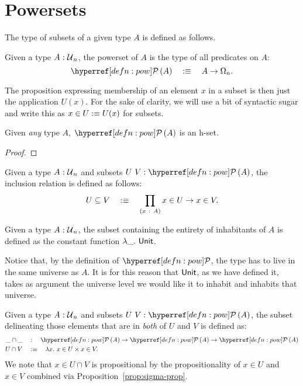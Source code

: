 \section{Powersets}\label{sec:pow}

The type of subsets of a given type $A$ is defined as follows.

\begin{defn}\label{defn:pow}
  Given a type $A\hspace{0.1mm}:\hspace{0.1mm}\mathcal{U}{}_n$, the powerset of $A$ is the type of all predicates
  on $A$:
  \begin{equation*}
    \pow{A} \quad\is\quad A \rightarrow \Omega_n.
  \end{equation*}
\end{defn}

The proposition expressing membership of an element $x$ in a subset is then just the
application $U(x)$. For the sake of clarity, we will use a bit of syntactic sugar and
write this as $x \in U :\equiv U(x)$ for subsets.

\begin{prop}\label{prop:pow-set}
  Given \emph{any} type $A$, $\pow{A}$ is an h-set.
\end{prop}
\begin{proof}
\end{proof}

\begin{defn}\label{defn:inclusion}
  Given a type $A\hspace{0.1mm}:\hspace{0.1mm}\mathcal{U}{}_n$ and subsets $\oftyII{U}{V}{\pow{A}}$, the inclusion
  relation is defined as follows:
  \begin{equation*}
    U \subseteq V \quad:\equiv\quad \prod_{(x~:~A)} x \in U \rightarrow x \in V.
  \end{equation*}
\end{defn}

\begin{defn}\label{defn:entire-subset}
  Given a type $A\hspace{0.1mm}:\hspace{0.1mm}\mathcal{U}{}_n$, the subset containing the entirety of inhabitants
  of $A$ is defined as the constant function $\lambda\_.~\mathsf{Unit}{}$.

  Notice that, by the definition of $\pownm{}$, the type has to live in the same universe
  as $A$. It is for this reason that $\mathsf{Unit}{}$, as we have defined it, takes as argument
  the universe level we would like it to inhabit and inhabits that universe.
\end{defn}

\begin{defn}\label{defn:intersection}
  Given a type $A\hspace{0.1mm}:\hspace{0.1mm}\mathcal{U}{}_n$ and subsets $\oftyII{U}{V}{\pow{A}}$, the subset
  delineating those elements that are in \emph{both} of $U$ and $V$ is defined as:
  \begin{align*}
    \_\cap\_  \quad&:\quad   \pow{A} \rightarrow \pow{A} \rightarrow \pow{A} \\
    U \cap V  \quad&\is\quad \lambda x.~ x \in U \times x \in V  .
  \end{align*}
  We note that $x \in U \cap V$ is propositional by the propositionality of $x \in U$ and $x \in V$
  combined via Proposition~\ref{prop:sigma-prop}.
\end{defn}

